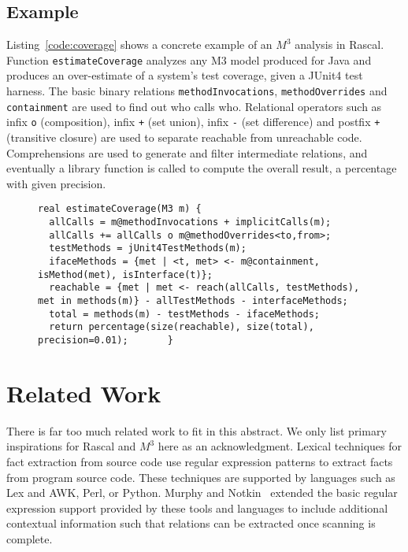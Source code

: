 \documentclass[conference]{IEEEtran}
\newcommand{\mthree}{\ensuremath{M^3}\xspace}
\begin{document}
\subsection{Example}

Listing~\ref{code:coverage} shows a concrete example of an \mthree analysis in
Rascal. Function \lstinline{estimateCoverage} analyzes any M3
model produced for Java and produces an over-estimate of a
system's test coverage, given a JUnit4 test harness. The basic
binary relations \lstinline{methodInvocations}, \lstinline{methodOverrides}
and \lstinline{containment} are used to find out who calls who. Relational
operators such as infix \lstinline{o} (composition), infix \lstinline{+} (set
union), infix \lstinline{-} (set difference) and postfix \lstinline{+}
(transitive closure) are used to separate reachable from unreachable code.
Comprehensions are used to generate and filter intermediate relations, and
eventually a library function is called to compute the overall result, a percentage with given
precision.


\begin{figure}[t]

\begin{lstlisting}[caption=Statically estimating test coverage using \mthree., label=code:coverage,language=rascal]
real estimateCoverage(M3 m) {
  allCalls = m@methodInvocations + implicitCalls(m);
  allCalls += allCalls o m@methodOverrides<to,from>;
  testMethods = jUnit4TestMethods(m);
  ifaceMethods = {met | <t, met> <- m@containment, isMethod(met), isInterface(t)};  
  reachable = {met | met <- reach(allCalls, testMethods), met in methods(m)} - allTestMethods - interfaceMethods;
  total = methods(m) - testMethods - ifaceMethods;
  return percentage(size(reachable), size(total), precision=0.01);       }
\end{lstlisting}
\vspace{-5mm}
\end{figure}

\section{Related Work}

There is far too much related work to fit in this abstract. We only list primary inspirations for Rascal and \mthree here as an acknowledgment.
%
Lexical techniques for fact extraction from source code use regular expression patterns to extract facts from
program source code. These techniques are supported by languages such as Lex and AWK, Perl, or Python. Murphy and
Notkin~\cite{DBLP:journals/tosem/MurphyN96} extended the
basic regular expression support provided by these tools and languages
to include additional contextual information such that relations can be extracted once scanning is complete.
\end{document}
